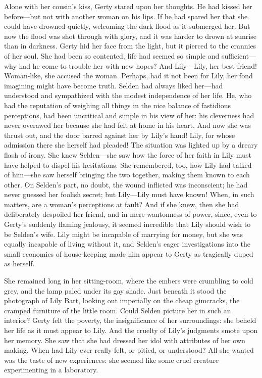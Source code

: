 \documentclass[12pt,a4paper]{book}
\begin{document}
Alone with her cousin's kiss, Gerty stared upon her thoughts. He
had kissed her before---but not with another woman on his lips. If
he had spared her that she could have drowned quietly, welcoming
the dark flood as it submerged her. But now the flood was shot
through with glory, and it was harder to drown at sunrise than in
darkness. Gerty hid her face from the light, but it pierced to
the crannies of her soul. She had been so contented, life had
seemed so simple and sufficient---why had he come to trouble her
with new hopes? And Lily---Lily, her best friend! Woman-like, she
accused the woman. Perhaps, had it not been for Lily, her fond
imagining might have become truth. Selden had always liked
her---had understood and sympathized with the modest independence
of her life. He, who had the reputation of weighing all things in
the nice balance of fastidious perceptions, had been uncritical
and simple in his view of her: his cleverness had never overawed
her because she had felt at home in his heart. And now she was
thrust out, and the door barred against her by Lily's hand! Lily,
for whose admission there she herself had pleaded! The situation
was lighted up by a dreary flash of irony. She knew Selden---she
saw how the force of her faith in Lily must have helped to dispel
his hesitations. She remembered, too, how Lily had talked of
him---she saw herself bringing the two together, making them known
to each other. On Selden's part, no doubt, the wound inflicted
was inconscient; he had never guessed her foolish secret; but
Lily---Lily must have known! When, in such matters, are a woman's
perceptions at fault? And if she knew, then she had deliberately
despoiled her friend, and in mere wantonness of power,
since, even to Gerty's suddenly flaming jealousy, it seemed
incredible that Lily should wish to be Selden's wife. Lily might
be incapable of marrying for money, but she was equally incapable
of living without it, and Selden's eager investigations into the
small economies of house-keeping made him appear to Gerty as
tragically duped as herself.





She remained long in her sitting-room, where the embers were
crumbling to cold grey, and the lamp paled under its gay shade. 
Just beneath it stood the photograph of Lily Bart, looking out
imperially on the cheap gimcracks, the cramped furniture of the
little room. Could Selden picture her in such an interior? Gerty
felt the poverty, the insignificance of her surroundings: she
beheld her life as it must appear to Lily. And the cruelty of
Lily's judgments smote upon her memory. She saw that she had
dressed her idol with attributes of her own making. When had Lily
ever really felt, or pitied, or understood? All she wanted was
the taste of new experiences: she seemed like some cruel creature
experimenting in a laboratory.
\end{document}
